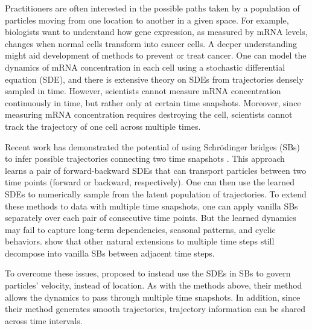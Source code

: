 Practitioners are often interested in the possible paths taken by a population of particles moving from one location to another in a given space. For example, biologists want to understand how gene expression, as measured by mRNA levels, changes when normal cells transform into cancer cells. A deeper understanding might aid development of methods to prevent or treat cancer. One can model the dynamics of mRNA concentration in each cell using a stochastic differential equation (SDE), and there is extensive theory on SDEs from trajectories densely sampled in time. However, scientists cannot measure mRNA concentration continuously in time, but rather only at certain time snapshots. Moreover, since measuring mRNA concentration requires destroying the cell, scientists cannot track the trajectory of one cell across multiple times. 

Recent work has demonstrated the potential of using Schr\"odinger bridges (SBs) to infer possible trajectories connecting two time snapshots \citep*{pavon2021data,de2021diffusion, Vargas2021,koshizuka2022neural, Wang2023}. This approach learns a pair of forward-backward SDEs that can transport particles between two time points (forward or backward, respectively). One can then use the learned SDEs to numerically sample from the latent population of trajectories. 
To extend these methods to data with multiple time snapshots, 
one can apply vanilla SBs separately over each pair of consecutive time points.  
But the learned dynamics may fail to capture long-term dependencies, seasonal patterns, and cyclic behaviors.
\citet{lavenant2024toward} show that other natural extensions to multiple time steps \citep{chen2019multi, lavenant2024toward} still decompose into vanilla SBs between adjacent time steps. 

To overcome these issues, \citet{chen2024deep} proposed to instead use the SDEs in SBs to govern particles' velocity, instead of location. As with the methods above, their method allows the dynamics to pass through multiple time snapshots.
In addition, since their method generates smooth trajectories, trajectory information can be shared across time intervals. 

